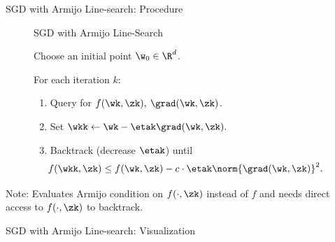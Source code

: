 \documentclass[mathserif,notheorems, hyperref={colorlinks, citecolor=blue, urlcolor=blue, linkcolor=blue}]{beamer}
\begin{document}
    \begin{frame}{SGD with Armijo Line-search: Procedure}
        
        \begin{figure}[t]
            \begin{procedure}{SGD with Armijo Line-Search}
            \item Choose an initial point \( \w_0 \in \R^d \).
                \vspace{1ex}
            \item For each iteration \( k \):
                \begin{enumerate}
                    \item Query \oracle{} for \( f(\wk, \zk), \: \grad(\wk, \zk) \). 
                        \vspace{0.5ex}
                    \item Set  \( \wkk \gets \wk - \etak \grad(\wk, \zk). \)
                        \vspace{0.5ex}
                    \item Backtrack (decrease \( \etak \)) until
                        \[  \hspace{-1em} f(\wkk, \zk) \leq f(\wk, \zk) - c \cdot \etak \norm{\grad(\wk, \zk)}^2. \]
                \end{enumerate}
            \end{procedure}
        \end{figure}

        Note: Evaluates Armijo condition on \( f(\cdot, \zk) \) instead of \( f \) and needs direct access to \( f(\cdot, \zk) \) to backtrack. 

    \end{frame}

    \begin{frame}{SGD with Armijo Line-search: Visualization}
        \begin{figure}[]
            \centering
            
        \end{figure} 
    \end{frame}
\end{document}
